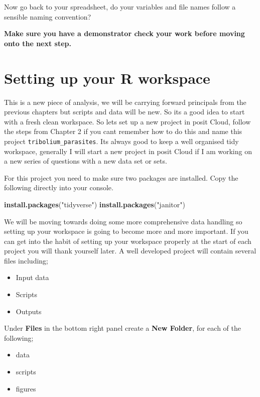 \documentclass[
]{book}
\newenvironment{Shaded}{\begin{snugshade}}{\end{snugshade}}
\newcommand{\FunctionTok}[1]{\textcolor[rgb]{0.13,0.29,0.53}{\textbf{#1}}}
\newcommand{\NormalTok}[1]{#1}
\newcommand{\StringTok}[1]{\textcolor[rgb]{0.31,0.60,0.02}{#1}}
\providecommand{\tightlist}{%
  \setlength{\itemsep}{0pt}\setlength{\parskip}{0pt}}
\begin{document}
Now go back to your spreadsheet, do your variables and file names follow a sensible naming convention?

\textbf{Make sure you have a demonstrator check your work before moving onto the next step.}

\hypertarget{workspace}{%
\section{Setting up your R workspace}\label{workspace}}

This is a new piece of analysis, we will be carrying forward principals from the previous chapters but scripts and data will be new. So its a good idea to start with a fresh clean workspace. So lets set up a new project in posit Cloud, follow the steps from Chapter 2 if you cant remember how to do this and name this project \texttt{tribolium\_parasites}. Its always good to keep a well organised tidy workspace, generally I will start a new project in posit Cloud if I am working on a new series of questions with a new data set or sets.

For this project you need to make sure two packages are installed. Copy the following directly into your console.

\begin{Shaded}
\begin{Highlighting}[]
\FunctionTok{install.packages}\NormalTok{(}\StringTok{"tidyverse"}\NormalTok{)}
\FunctionTok{install.packages}\NormalTok{(}\StringTok{"janitor"}\NormalTok{)}
\end{Highlighting}
\end{Shaded}

We will be moving towards doing some more comprehensive data handling so setting up your workspace is going to become more and more important. If you can get into the habit of setting up your workspace properly at the start of each project you will thank yourself later. A well developed project will contain several files including;

\begin{itemize}
\tightlist
\item
  Input data
\item
  Scripts
\item
  Outputs
\end{itemize}

Under \textbf{Files} in the bottom right panel create a \textbf{New Folder}, for each of the following;

\begin{itemize}
\tightlist
\item
  data
\item
  scripts
\item
  figures
\end{itemize}
\end{document}
